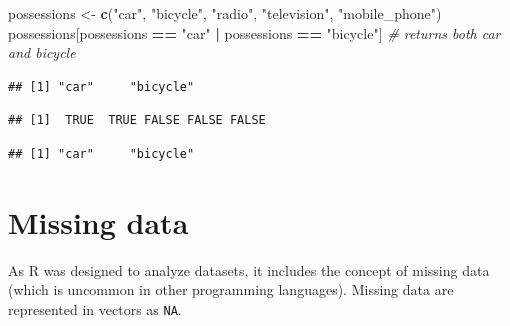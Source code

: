 \documentclass[]{book}
\newenvironment{Shaded}{\begin{snugshade}}{\end{snugshade}}
\newcommand{\KeywordTok}[1]{\textcolor[rgb]{0.13,0.29,0.53}{\textbf{#1}}}
\newcommand{\StringTok}[1]{\textcolor[rgb]{0.31,0.60,0.02}{#1}}
\newcommand{\CommentTok}[1]{\textcolor[rgb]{0.56,0.35,0.01}{\textit{#1}}}
\newcommand{\OperatorTok}[1]{\textcolor[rgb]{0.81,0.36,0.00}{\textbf{#1}}}
\newcommand{\NormalTok}[1]{#1}
\begin{document}
\begin{Shaded}
\begin{Highlighting}[]
\NormalTok{possessions <-}\StringTok{ }\KeywordTok{c}\NormalTok{(}\StringTok{"car"}\NormalTok{, }\StringTok{"bicycle"}\NormalTok{, }\StringTok{"radio"}\NormalTok{, }\StringTok{"television"}\NormalTok{, }\StringTok{"mobile_phone"}\NormalTok{)}
\NormalTok{possessions[possessions }\OperatorTok{==}\StringTok{ "car"} \OperatorTok{|}\StringTok{ }\NormalTok{possessions }\OperatorTok{==}\StringTok{ "bicycle"}\NormalTok{] }\CommentTok{# returns both car and bicycle}
\end{Highlighting}
\end{Shaded}

\begin{verbatim}
## [1] "car"     "bicycle"
\end{verbatim}

\begin{Shaded}
\end{Shaded}

\begin{verbatim}
## [1]  TRUE  TRUE FALSE FALSE FALSE
\end{verbatim}

\begin{Shaded}
\end{Shaded}

\begin{verbatim}
## [1] "car"     "bicycle"
\end{verbatim}

\section{Missing data}\label{missing-data}

As R was designed to analyze datasets, it includes the concept of
missing data (which is uncommon in other programming languages). Missing
data are represented in vectors as \texttt{NA}.
\end{document}
